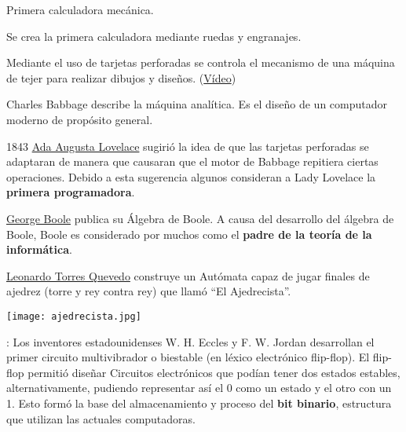 \begin{description}
    \item[1623] Primera calculadora mecánica.

    \item[1666] Se crea la primera calculadora mediante ruedas y engranajes.

    \item[1801] Mediante el uso de tarjetas perforadas se controla el mecanismo de una máquina de tejer para realizar dibujos y diseños. (\href{https://www.youtube.com/watch?v=MQzpLLhN0fY}{Vídeo})

    \item[1837] Charles Babbage describe la máquina analítica. Es el diseño de un computador moderno de propósito general.

    \begin{minipage}{0.7\linewidth}
        \item[1843] \href{https://es.wikipedia.org/wiki/Ada_Lovelace}{Ada Augusta Lovelace} sugirió la idea de que las tarjetas perforadas se adaptaran de manera que causaran que el motor de Babbage repitiera ciertas operaciones. Debido a esta sugerencia algunos consideran a Lady Lovelace la \textbf{primera programadora}.
    \end{minipage}
    \hfill
    \begin{minipage}{0.2\linewidth}
        \hfill
        
    \end{minipage}

    \item[1854] \href{https://es.wikipedia.org/wiki/George_Boole}{George Boole} publica su Álgebra de Boole. A causa del desarrollo del álgebra de Boole, Boole es considerado por muchos como el \textbf{padre de la teoría de la informática}.

    \item[1912] \href{https://es.wikipedia.org/wiki/Leonardo_Torres_Quevedo}{Leonardo Torres Quevedo} construye un Autómata capaz de jugar finales de ajedrez (torre y rey contra rey)  que llamó “El Ajedrecista”.

    \begin{center}
        \texttt{[image: ajedrecista.jpg]}
    \end{center}

    \item[1919]: Los inventores estadounidenses W. H. Eccles y F. W. Jordan desarrollan el primer circuito multivibrador o biestable (en léxico electrónico flip-flop). El flip-flop permitió diseñar Circuitos electrónicos que podían tener dos estados estables, alternativamente, pudiendo representar así el 0 como un estado y el otro con un 1. Esto formó la base del almacenamiento y proceso del \textbf{bit binario}, estructura que utilizan las actuales computadoras.


\end{description}
